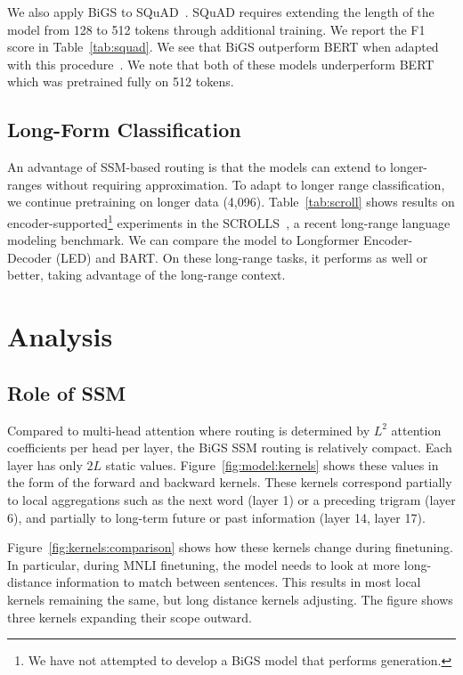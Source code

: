 We also apply BiGS to SQuAD~\citep{rajpurkar2016squad}. SQuAD requires extending the length of the model from 128 to 512 tokens through additional training. We report the F1 score in Table~\ref{tab:squad}. 
We see that BiGS outperform BERT when adapted with this procedure~\citep{wettig2022should}. We note that both of these models underperform BERT which was pretrained fully on 512 tokens. 

\subsection{Long-Form Classification}

An advantage of SSM-based routing is that the models can extend to longer-ranges without requiring approximation. To adapt to longer range classification, we continue pretraining on longer data (4,096). Table~\ref{tab:scroll} shows results on encoder-supported\footnote{We have not attempted to develop a BiGS model that performs generation.} experiments in the SCROLLS~\cite{shaham2022scrolls}, a recent long-range language modeling benchmark. We can compare the model to Longformer Encoder-Decoder (LED) and BART. On these long-range tasks, it performs as well or better, taking advantage of the long-range context. 

\section{Analysis}

\subsection{Role of SSM}

Compared to multi-head attention where routing is determined by $L^2$ attention coefficients per head per layer, the BiGS SSM routing is relatively compact. Each layer has only $2L$ static values. Figure~\ref{fig:model:kernels} shows these values in the form of the forward and backward kernels. These kernels correspond partially to local aggregations such as the next word (layer 1) or a preceding trigram (layer 6), and partially to long-term future or past information (layer 14, layer 17). 

Figure~\ref{fig:kernels:comparison} shows how these kernels change during finetuning. In particular, during MNLI finetuning, the model needs to look at more long-distance information to match between sentences. This results in most local kernels remaining the same, but long distance kernels adjusting. The figure shows three kernels expanding their scope outward.  

